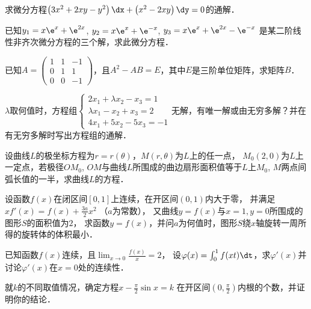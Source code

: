 \documentclass[plain,noanswer,medmath]{../../template/jnuexam}
\begin{document}
\begin{problem}
求微分方程$\left(3x^2 + 2xy - y^2 \right)\dx + \left(x^2 - 2xy \right)\dy = 0$的通解．
\end{problem}


\begin{problem}
已知$y_1 = x\e^x + \e^{2x}$, $y_2 = x\e^x + \e^{- x}$, $y_3 = x\e^x + \e^{2x} - \e^{- x}$
是某二阶线性非齐次微分方程的三个解，求此微分方程．
\end{problem}


\begin{problem}
已知$A = \begin{pmatrix}
  1 & 1 & -1 \\
  0 & 1 & 1 \\
  0 & 0 & -1
\end{pmatrix}$，且$A^2 - AB = E$，其中$E$是三阶单位矩阵，求矩阵$B$．
\end{problem}



\begin{problem}
$\lambda$取何值时，方程组$\begin{cases}
  2x_1 + \lambda x_2 - x_3 = 1 \\
  \lambda x_1 - x_2+ x_3 = 2 \\
  4x_1 + 5x_2 - 5x_3 = - 1
\end{cases}$无解，有唯一解或由无穷多解？并在有无穷多解时写出方程组的通解．
\end{problem}



\begin{problem}
设曲线$L$的极坐标方程为$r = r(\theta)$，$M(r,\theta)$为$L$上的任一点，
$M_0(2,0)$为$L$上一定点，若极径$OM_0$, $OM$与曲线$L$所围成的曲边扇形面积值等于$L$上$M_0$,
 $M$两点间弧长值的一半，求曲线$L$的方程．
\end{problem}



\begin{problem}
设函数$f(x)$在闭区间$[0,1]$上连续，在开区间$(0,1)$内大于零，
并满足$xf'(x) = f(x) + \frac{3a}{2}x^2$ （$a$为常数），
又曲线$y = f(x)$与$x = 1,y = 0$所围成的图形$S$的面积值为$2$，
求函数$y = f(x)$，并问$a$为何值时，图形$S$绕$x$轴旋转一周所得的旋转体的体积最小．
\end{problem}



\begin{problem}
已知函数$f(x)$连续，且$\lim_{x \to 0} \frac{f(x)}{x} = 2$，
设$\varphi (x) = \int_0^1f(xt) \dt$，求$\varphi'(x)$并讨论$\varphi'(x)$在$x = 0$处的连续性．
\end{problem}



\begin{problem}
就$k$的不同取值情况，确定方程$x - \frac{\pi}{2}\sin x = k$
在开区间$\left(0,\frac{\pi}{2} \right)$内根的个数，并证明你的结论．
\end{problem}
\end{document}
